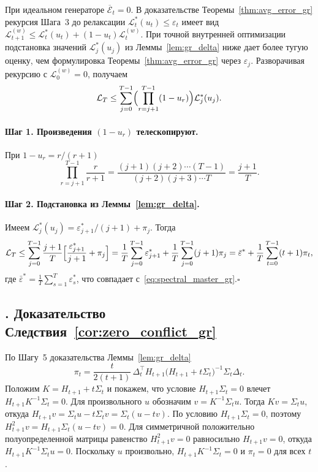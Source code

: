 \documentclass[a4paper,14pt,oneside,openany]{extarticle}
\newcommand{\cL}{\mathcal{L}}
\begin{document}
При идеальном генераторе $\overline{\mathcal E}_t = 0$. В доказательстве Теоремы~\ref{thm:avg_error_gr} рекурсия Шага~3 до релаксации $\cL^*_t(u_t) \le \varepsilon_t$ имеет вид $\cL^{(w)}_{t+1} \le \cL^*_t(u_t) + (1 - u_t)\cL^{(w)}_t$. При точной внутренней оптимизации подстановка значений $\cL^*_j(u_j)$ из Леммы~\ref{lem:gr_delta} ниже дает более тугую оценку, чем формулировка Теоремы~\ref{thm:avg_error_gr} через $\varepsilon_j$. Разворачивая рекурсию с $\cL^{(w)}_0 = 0$, получаем
\begin{equation}
    \cL_T \le \sum_{j=0}^{T-1}\Bigl(\prod_{r=j+1}^{T-1}(1 - u_r)\Bigr)\cL^*_j(u_j).
    \label{eq:app_unfolded}
\end{equation}

\paragraph{Шаг 1. Произведения $(1-u_r)$ телескопируют.} При $1 - u_r = r/(r+1)$
\[
    \prod_{r=j+1}^{T-1}\frac{r}{r+1} = \frac{(j+1)(j+2)\cdots(T-1)}{(j+2)(j+3)\cdots T} = \frac{j+1}{T}.
\]

\paragraph{Шаг 2. Подстановка из Леммы~\ref{lem:gr_delta}.} Имеем $\cL^*_j(u_j) = \varepsilon^*_{j+1}/(j+1) + \pi_j$. Тогда
\[
    \cL_T \le \sum_{j=0}^{T-1}\frac{j+1}{T}\Bigl[\frac{\varepsilon^*_{j+1}}{j+1} + \pi_j\Bigr] = \frac{1}{T}\sum_{j=0}^{T-1} \varepsilon^*_{j+1} + \frac{1}{T}\sum_{j=0}^{T-1}(j+1)\pi_j = \bar\varepsilon^* + \frac{1}{T}\sum_{t=0}^{T-1}(t+1)\pi_t,
\]
где $\bar\varepsilon^* = \tfrac{1}{T}\sum_{s=1}^T \varepsilon^*_s$, что совпадает с~\eqref{eq:spectral_master_gr}.\hfill$\square$

\subsection*{\theappthm. Доказательство Следствия~\ref{cor:zero_conflict_gr}}\label{app:proof_zero_conflict}

По Шагу~5 доказательства Леммы~\ref{lem:gr_delta}
\[
    \pi_t = \frac{t}{2(t+1)}\,\Delta_t^\top H_{t+1}\bigl(H_{t+1} + t\Sigma_t\bigr)^{-1} \Sigma_t \Delta_t.
\]
Положим $K = H_{t+1} + t\Sigma_t$ и покажем, что условие $H_{t+1}\Sigma_t = 0$ влечет $H_{t+1} K^{-1}\Sigma_t = 0$. Для произвольного $u$ обозначим $v = K^{-1}\Sigma_t u$. Тогда $K v = \Sigma_t u$, откуда $H_{t+1} v = \Sigma_t u - t\Sigma_t v = \Sigma_t (u - t v)$. По условию $H_{t+1}\Sigma_t = 0$, поэтому $H_{t+1}^2 v = H_{t+1}\Sigma_t (u - t v) = 0$. Для симметричной положительно полуопределенной матрицы равенство $H_{t+1}^2 v = 0$ равносильно $H_{t+1} v = 0$, откуда $H_{t+1} K^{-1}\Sigma_t u = 0$. Поскольку $u$ произвольно, $H_{t+1} K^{-1}\Sigma_t = 0$ и $\pi_t = 0$ для всех $t$.
\end{document}

